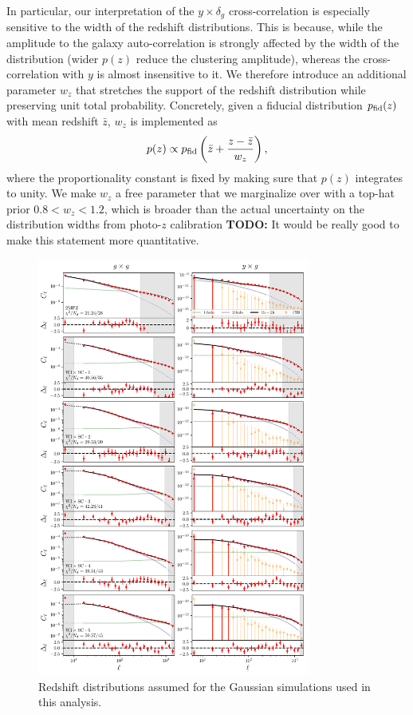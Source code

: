 \documentclass[useAMS,usenatbib]{mn2e}
\newcommand{\todo}[1]{{\bf TODO:} #1}
\begin{document}
      In particular, our interpretation of the $y\times \delta_g$ cross-correlation is especially sensitive to the width of the redshift distributions. This is because, while the amplitude to the galaxy auto-correlation is strongly affected by the width of the distribution (wider $p(z)$ reduce the clustering amplitude), whereas the cross-correlation with $y$ is almost insensitive to it. We therefore introduce an additional parameter $w_z$ that stretches the support of the redshift distribution while preserving unit total probability. Concretely, given a fiducial distribution $p_{\rm fid}(z)$ with mean redshift $\bar{z}$, $w_z$ is implemented as
      \begin{equation}
        p(z)\propto p_{\rm fid}\left(\bar{z}+\frac{z-\bar{z}}{w_z}\right),
      \end{equation}
      where the proportionality constant is fixed by making sure that $p(z)$ integrates to unity. We make $w_z$ a free parameter that we marginalize over with a top-hat prior $0.8<w_z<1.2$, which is broader than the actual uncertainty on the distribution widths from photo-$z$ calibration \todo{It would be really good to make this statement more quantitative}.
  \begin{figure}
    \centering
    \includegraphics[width=0.8\textwidth]{fits.pdf}
    \caption{Redshift distributions assumed for the Gaussian simulations used in this analysis.}
    \label{fig:cls}
  \end{figure}
\end{document}
